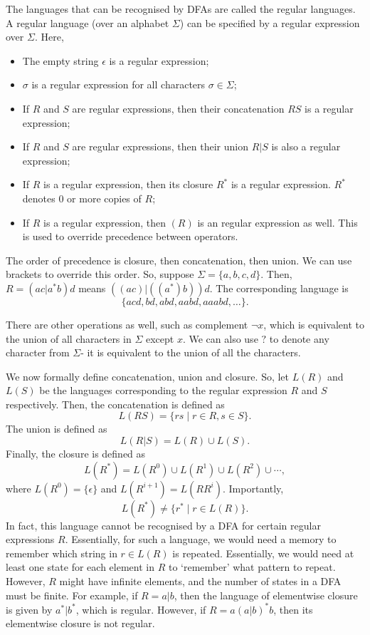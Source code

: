 \documentclass[a4paper, openany]{memoir}
\begin{document}
The languages that can be recognised by DFAs are called the regular languages. A regular language (over an alphabet $\Sigma$) can be specified by a regular expression over $\Sigma$. Here,
\begin{itemize}
    \item The empty string $\epsilon$ is a regular expression;
    \item $\sigma$ is a regular expression for all characters $\sigma \in \Sigma$;
    \item If $R$ and $S$ are regular expressions, then their concatenation $RS$ is a regular expression;
    \item If $R$ and $S$ are regular expressions, then their union $R | S$ is also a regular expression;
    \item If $R$ is a regular expression, then its closure $R^*$ is a regular expression. $R^*$ denotes 0 or more copies of $R$;
    \item If $R$ is a regular expression, then $(R)$ is an regular expression as well. This is used to override precedence between operators.
\end{itemize}

The order of precedence is closure, then concatenation, then union. We can use brackets to override this order. So, suppose $\Sigma = \{a, b, c, d\}$. Then, $R = (ac | a^* b)d$ means $((ac) | ((a^*) b)) d$. The corresponding language is
\[\{acd, bd, abd, aabd, aaabd, \dots\}.\]

There are other operations as well, such as complement $\lnot x$, which is equivalent to the union of all characters in $\Sigma$ except $x$. We can also use $?$ to denote any character from $\Sigma$- it is equivalent to the union of all the characters.

We now formally define concatenation, union and closure. So, let $L(R)$ and $L(S)$ be the languages corresponding to the regular expression $R$ and $S$ respectively. Then, the concatenation is defined as
\[L(RS) = \{rs \mid r \in R, s \in S\}.\]
The union is defined as
\[L(R | S) = L(R) \cup L(S).\]
Finally, the closure is defined as
\[L(R^*) = L(R^0) \cup L(R^1) \cup L(R^2) \cup \cdots,\]
where $L(R^0) = \{\epsilon\}$ and $L(R^{i+1}) = L(RR^i)$. Importantly,
\[L(R^*) \neq \{r^* \mid r \in L(R)\}.\]
In fact, this language cannot be recognised by a DFA for certain regular expressions $R$. Essentially, for such a language, we would need a memory to remember which string in $r \in L(R)$ is repeated. Essentially, we would need at least one state for each element in $R$ to `remember' what pattern to repeat. However, $R$ might have infinite elements, and the number of states in a DFA must be finite. For example, if $R = a|b$, then the language of elementwise closure is given by $a^*|b^*$, which is regular. However, if $R = a(a|b)^*b$, then its elementwise closure is not regular.
\end{document}
